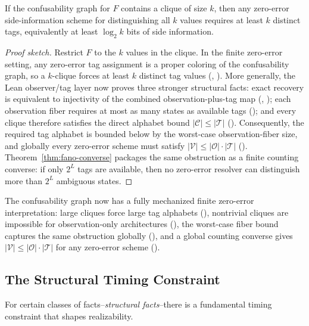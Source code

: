\begin{lemma}\label{lem:confusability-clique}
If the confusability graph for $F$ contains a clique of size $k$, then any zero-error side-information scheme for distinguishing all $k$ values requires at least $k$ distinct tags, equivalently at least $\log_2 k$ bits of side information.
\end{lemma}

\begin{proof}[Proof sketch]
Restrict $F$ to the $k$ values in the clique. In the finite zero-error setting, any zero-error tag assignment is a proper coloring of the confusability graph, so a $k$-clique forces at least $k$ distinct tag values (, ). More generally, the Lean observer/tag layer now proves three stronger structural facts: exact recovery is equivalent to injectivity of the combined observation-plus-tag map (, ); each observation fiber requires at most as many states as available tags (); and every clique therefore satisfies the direct alphabet bound $|\mathcal C|\le |\mathcal T|$ (). Consequently, the required tag alphabet is bounded below by the worst-case observation-fiber size, and globally every zero-error scheme must satisfy $|\mathcal V|\le |\mathcal O|\cdot |\mathcal T|$ (). Theorem~\ref{thm:fano-converse} packages the same obstruction as a finite counting converse: if only $2^L$ tags are available, then no zero-error resolver can distinguish more than $2^L$ ambiguous states.
\end{proof}

\noindent The confusability graph now has a fully mechanized finite zero-error interpretation: large cliques force large tag alphabets (), nontrivial cliques are impossible for observation-only architectures (), the worst-case fiber bound captures the same obstruction globally (), and a global counting converse gives $|\mathcal V|\le |\mathcal O|\cdot |\mathcal T|$ for any zero-error scheme ().

\subsection{The Structural Timing Constraint}\label{sec:timing}

For certain classes of facts--\emph{structural facts}--there is a fundamental timing constraint that shapes realizability.

